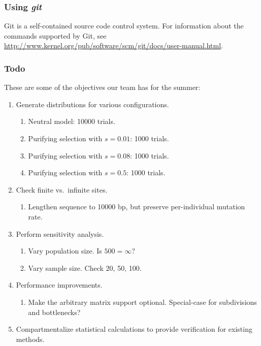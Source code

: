 \documentclass{article}
\begin{document}
      \subsubsection{Using {\em git}}
        \label{sec:git}

        Git is a self-contained source code control system. For information
        about the commands supported by Git, see
        \url{http://www.kernel.org/pub/software/scm/git/docs/user-manual.html}.

      \subsubsection{Todo}
        \label{sec:todo}

        These are some of the objectives our team has for the summer:

        \begin{enumerate}
          \item Generate distributions for various configurations.
            \begin{enumerate}
              \item Neutral model: 10000 trials.
              \item Purifying selection with $s=0.01$: 1000 trials.
              \item Purifying selection with $s=0.08$: 1000 trials.
              \item Purifying selection with $s=0.5$: 1000 trials.
            \end{enumerate}

          \item Check finite vs.\ infinite sites.
            \begin{enumerate}
              \item Lengthen sequence to 10000 bp, but preserve per-individual
              mutation rate.
            \end{enumerate}

          \item Perform sensitivity analysis.
            \begin{enumerate}
              \item Vary population size. Is $500 = \infty$?
              \item Vary sample size. Check 20, 50, 100.
            \end{enumerate}

	  \item Performance improvements.
	    \begin{enumerate}
	      \item Make the arbitrary matrix support optional. Special-case for
	      subdivisions and bottlenecks?
	    \end{enumerate}

	  \item Compartmentalize statistical calculations to provide
	  verification for existing methods.
        \end{enumerate}
\end{document}
